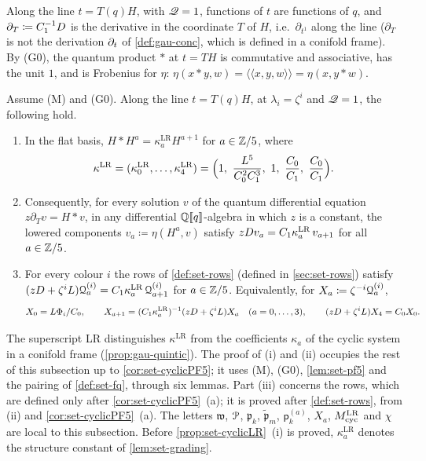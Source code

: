 
Along the line $t=T(q)H$, with $\mathscr{Q}=1$, functions of $t$ are functions of $q$, and $\partial_T\coloneqq C_1^{-1}D$ is the derivative in the coordinate $T$ of $H$, i.e.\ $\partial_{t^1}$ along the line ($\partial_T$ is not the derivation $\partial_t$ of \cref{def:gau-conc}, which is defined in a conifold frame). By (G0), the quantum product $*$ at $t=TH$ is commutative and associative, has the unit $1$, and is Frobenius for $\eta$: $\eta(x*y,w)=\langle\!\langle x,y,w\rangle\!\rangle=\eta(x,y*w)$.

\begin{prop}
\label{prop:set-cyclicLR}
Assume (M) and (G0). Along the line $t=T(q)H$, at $\lambda_i=\zeta^i$ and $\mathscr{Q}=1$, the following hold.
\begin{enumerate}
\item In the flat basis, $H*H^a=\kappa^{\mathrm{LR}}_aH^{a+1}$ for $a\in\mathbb{Z}/5$, where
\[
\kappa^{\mathrm{LR}}=(\kappa^{\mathrm{LR}}_0,\dots,\kappa^{\mathrm{LR}}_4)=\Bigl(1,\ \frac{L^5}{C_0^2C_1^3},\ 1,\ \frac{C_0}{C_1},\ \frac{C_0}{C_1}\Bigr).
\]
\item Consequently, for every solution $v$ of the quantum differential equation $z\partial_Tv=H*v$, in any differential $\mathbb{Q}[\![ q ]\!]$-algebra in which $z$ is a constant, the lowered components $v_a\coloneqq\eta(H^a,v)$ satisfy $zD v_a=C_1\kappa^{\mathrm{LR}}_a\,v_{a+1}$ for all $a\in\mathbb{Z}/5$.
\item For every colour $i$ the rows of \cref{def:set-rows} (defined in \cref{sec:set-rows}) satisfy $(zD+\zeta^iL)\mathcal{Q}^{(i)}_a=C_1\kappa^{\mathrm{LR}}_a\,\mathcal{Q}^{(i)}_{a+1}$ for $a\in\mathbb{Z}/5$. Equivalently, for $X_a\coloneqq\zeta^{-i}\mathcal{Q}^{(i)}_a$,
\[
X_0=L\Phi_i/C_0,\qquad X_{a+1}=(C_1\kappa^{\mathrm{LR}}_a)^{-1}(zD+\zeta^iL)X_a\quad(a=0,\dots,3),\qquad(zD+\zeta^iL)X_4=C_0X_0 .
\]
\end{enumerate}
\end{prop}

The superscript LR distinguishes $\kappa^{\mathrm{LR}}$ from the coefficients $\kappa_a$ of the cyclic system in a conifold frame (\cref{prop:gau-quintic}). The proof of (i) and (ii) occupies the rest of this subsection up to \cref{cor:set-cyclicPF5}; it uses (M), (G0), \cref{lem:set-pf5} and the pairing of \cref{def:set-fq}, through six lemmas. Part (iii) concerns the rows, which are defined only after \cref{cor:set-cyclicPF5}~(a); it is proved after \cref{def:set-rows}, from (ii) and \cref{cor:set-cyclicPF5}~(a). The letters $\mathfrak w$, $\mathcal{P}$, $\mathfrak p_k$, $\tilde{\mathfrak p}_m$, $\mathsf p^{(a)}_k$, $X_a$, $M_{\mathrm{cyc}}^{\mathrm{LR}}$ and $\chi$ are local to this subsection. Before \cref{prop:set-cyclicLR}~(i) is proved, $\kappa^{\mathrm{LR}}_a$ denotes the structure constant of \cref{lem:set-grading}.

